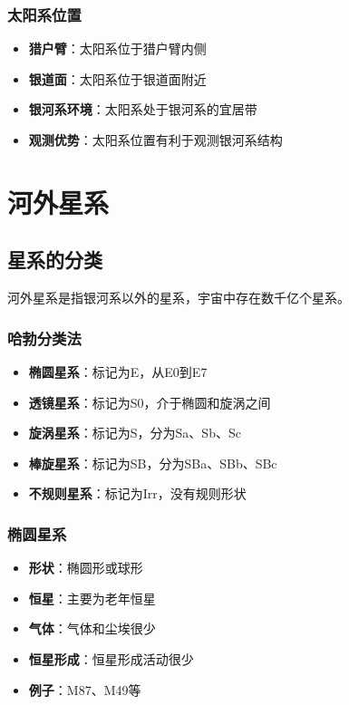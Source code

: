 \documentclass[12pt,UTF8]{ctexbook}
\begin{document}
\subsection{太阳系位置}

\begin{itemize}
  \item \textbf{猎户臂}：太阳系位于猎户臂内侧
  \item \textbf{银道面}：太阳系位于银道面附近
  \item \textbf{银河系环境}：太阳系处于银河系的宜居带
  \item \textbf{观测优势}：太阳系位置有利于观测银河系结构
\end{itemize}

\chapter{河外星系}
\section{星系的分类}

河外星系是指银河系以外的星系，宇宙中存在数千亿个星系。

\subsection{哈勃分类法}

\begin{itemize}
  \item \textbf{椭圆星系}：标记为E，从E0到E7
  \item \textbf{透镜星系}：标记为S0，介于椭圆和旋涡之间
  \item \textbf{旋涡星系}：标记为S，分为Sa、Sb、Sc
  \item \textbf{棒旋星系}：标记为SB，分为SBa、SBb、SBc
  \item \textbf{不规则星系}：标记为Irr，没有规则形状
\end{itemize}

\subsection{椭圆星系}

\begin{itemize}
  \item \textbf{形状}：椭圆形或球形
  \item \textbf{恒星}：主要为老年恒星
  \item \textbf{气体}：气体和尘埃很少
  \item \textbf{恒星形成}：恒星形成活动很少
  \item \textbf{例子}：M87、M49等
\end{itemize}
\end{document}
